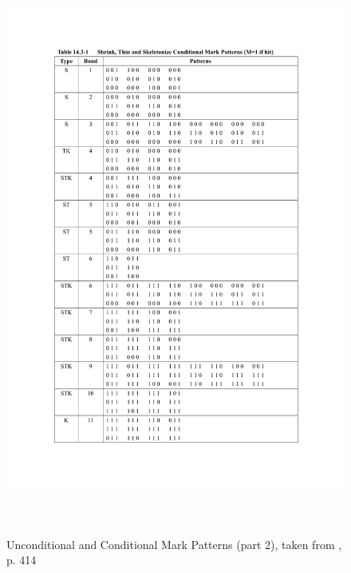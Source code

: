 \documentclass{article}
\begin{document}
\begin{figure}[hb]
 \includegraphics[page=2,height=19cm]{images/patternTables.pdf}
 \caption{Unconditional and Conditional Mark Patterns (part 2), taken from \cite{Pratt:2001:DIP:516234}, p. 414}
 \label{fig:markpatterns2}
\end{figure}
\end{document}
